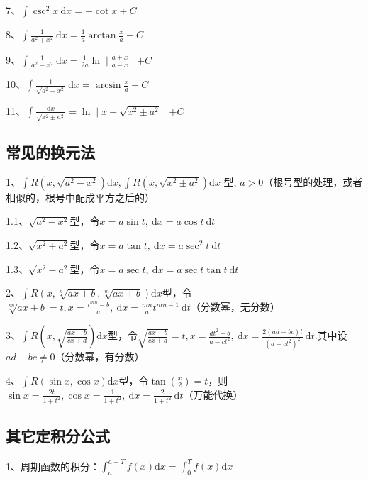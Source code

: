 7、$ \int \csc ^{2} x \mathrm{~d} x=-\cot x+C $

8、$ \int \frac{1}{a^{2}+x^{2}} \mathrm{~d} x=\frac{1}{a} \arctan \frac{x}{a}+C $

9、$ \int \frac{1}{a^{2}-x^{2}} \mathrm{~d} x=\frac{1}{2 a} \ln \mid \frac{a+x}{a-x} \mid+C $

10、$ \int \frac{1}{\sqrt{a^{2}-x^{2}}} \mathrm{~d} x=\arcsin \frac{x}{a}+C $

11、$ \int \frac{\mathrm{d} x}{\sqrt{x^{2} \pm a^{2}}}=\ln \mid x+\sqrt{x^{2} \pm a^{2}} \mid+ C $



\subsection{常见的换元法}

1、$ \int R\left(x, \sqrt{a^{2}-x^{2}}\right) \mathrm{d} x, \int R\left(x, \sqrt{x^{2} \pm a^{2}}\right) \mathrm{d} x \text { 型, } a>0 $（根号型的处理，或者相似的，根号中配成平方之后的）

1.1、$ \sqrt{a^{2}-x^{2}} $型，令$ x=a \sin t, \mathrm{~d} x=a \cos t \mathrm{~d} t $

1.2、$ \sqrt{x^{2}+a^{2}} $型，令$ x=a \tan t, \mathrm{~d} x=a \sec ^{2} t \mathrm{~d} t $

1.3、$ \sqrt{x^{2}-a^{2}} $型，令$ x=a \sec t, \mathrm{~d} x=a \sec t \tan t \mathrm{~d} t $

2、$ \int R(x, \sqrt[n]{a x+b}, \sqrt[m]{a x+b}) \mathrm{d} x $型，令$ \sqrt[n n]{a x+b}=t, x=\frac{t^{m n}-b}{a}, \mathrm{~d} x=\frac{m n}{a} t^{m n-1} \mathrm{~d} t $（分数幂，无分数）

3、$ \int R\left(x, \sqrt{\frac{a x+b}{c x+d}}\right) \mathrm{d} x $型，令$ \sqrt{\frac{a x+b}{c x+d}}=t, x=\frac{d t^{2}-b}{a-c t^{2}}, \mathrm{~d} x=\frac{2(a d-b c) t}{\left(a-c t^{2}\right)^{2}} \mathrm{~d} t . $其中设$ a d-b c \neq 0 $（分数幂，有分数）

4、$ \int R(\sin x, \cos x) \mathrm{d} x $型，令$ \tan({\frac{x}{2}})=t $，则$ \sin x=\frac{2 t}{1+t^{2}}, \cos x=\frac{1}{1+t^{2}}, \mathrm{~d} x=\frac{2}{1+t^{2}} \mathrm{~d} t $（万能代换）



\subsection{其它定积分公式}

1、周期函数的积分：$ \int_{a}^{a+T} f(x) \mathrm{d} x=\int_{0}^{T} f(x) \mathrm{d} x $

